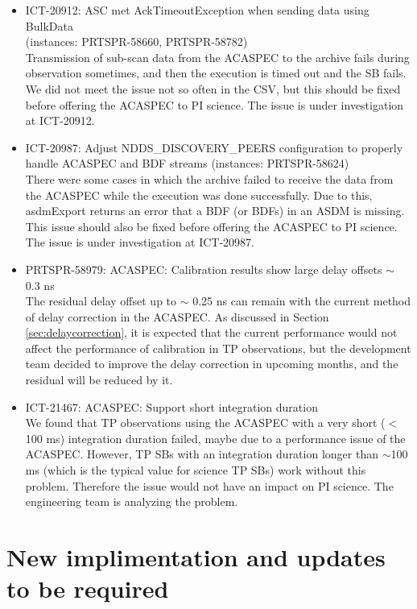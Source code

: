 \begin{itemize}
\item ICT-20912: ASC met AckTimeoutException when sending data using BulkData \\ (instances: PRTSPR-58660, PRTSPR-58782)\\
Transmission of sub-scan data from the ACASPEC to the archive fails during observation sometimes, and then the execution is timed out and the SB fails. We did not meet the issue not so often in the CSV, but this should be fixed before offering the ACASPEC to PI science. The issue is under investigation at ICT-20912. 
\item ICT-20987: Adjust NDDS\_DISCOVERY\_PEERS configuration to properly handle ACASPEC and BDF streams (instances: PRTSPR-58624)\\
There were some cases in which the archive failed to receive the data from the ACASPEC while the execution was done successfully. Due to this, asdmExport returns an error that a BDF (or BDFs) in an ASDM is missing. This issue should also be fixed before offering the ACASPEC to PI science. The issue is under investigation at ICT-20987.   

\item PRTSPR-58979: ACASPEC: Calibration results show large delay offsets $\sim$ 0.3 ns \\
The residual delay offset up to $\sim$ 0.25 ns can remain with the current method of delay correction in the ACASPEC. As discussed in Section \ref{sec:delaycorrection}, it is expected that the current performance would not affect the performance of calibration in TP observations, but the development team decided to improve the delay correction in upcoming months, and the residual will be reduced by it.

\item ICT-21467: ACASPEC: Support short integration duration \\
We found that TP observations using the ACASPEC with a very short ($<$ 100 ms) integration duration failed, maybe due to a performance issue of the ACASPEC. However, TP SBs with an integration duration longer than $\sim$100 ms (which is the typical value for science TP SBs) work without this problem. Therefore the issue would not have an impact on PI science. The engineering team is analyzing the problem.

\end{itemize}

\section{New implimentation and updates to be required}\label{sec: updates}

